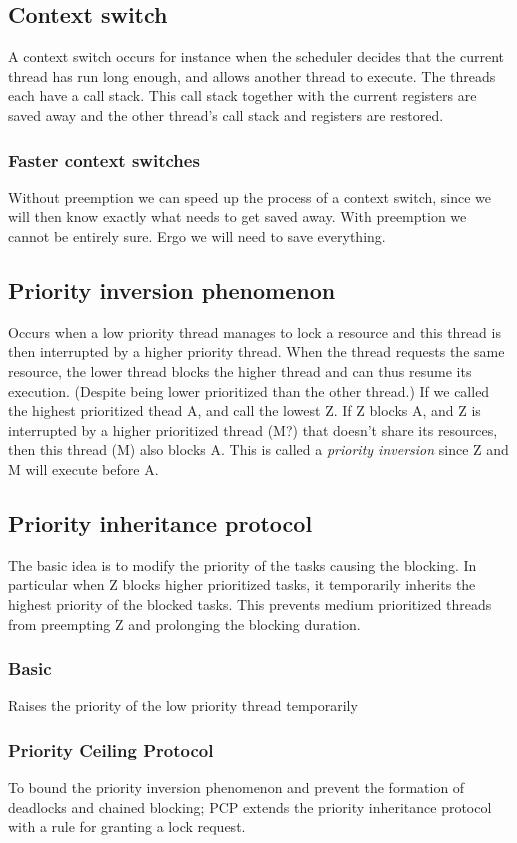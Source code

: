 \documentclass[a4paper]{article}
\begin{document}
\subsection{Context switch}
A context switch occurs for instance when the scheduler decides that the
current thread has run long enough, and allows another thread to execute. The
threads each have a call stack. This call stack together with the current
registers are saved away and the other thread's call stack and registers are
restored.

\subsubsection{Faster context switches}
Without preemption we can speed up the process of a context switch, since
we will then know exactly what needs to get saved away. With preemption we
cannot be entirely sure. Ergo we will need to save everything.

\subsection{Priority inversion phenomenon}
Occurs when a low priority thread manages to lock a resource and this thread
is then interrupted by a higher priority thread. When the thread requests the
same resource, the lower thread blocks the higher thread and can thus resume
its execution. (Despite being lower prioritized than the other thread.)
If we called the highest prioritized thead A, and call the lowest Z. If Z
blocks A, and Z is interrupted by a higher prioritized thread (M?) that doesn't
share its resources, then this thread (M) also blocks A. This is called a 
\emph{priority inversion} since Z and M will execute before A.

\subsection{Priority inheritance protocol}
The basic idea is to modify the priority of the tasks causing the blocking. In
particular when Z blocks higher prioritized tasks, it temporarily inherits the
highest priority of the blocked tasks. This prevents medium prioritized threads
from preempting Z and prolonging the blocking duration.
\subsubsection{Basic}
Raises the priority of the low priority thread temporarily
\subsubsection{Priority Ceiling Protocol}
To bound the priority inversion phenomenon and prevent the formation of deadlocks
and chained blocking; PCP extends the priority inheritance protocol with a
rule for granting a lock request.
\end{document}
